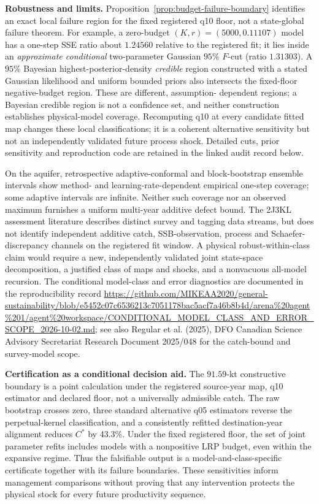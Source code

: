 \documentclass[11pt]{article}
\begin{document}
\noindent\textbf{Robustness and limits.}
Proposition~\ref{prop:budget-failure-boundary} identifies an exact local
failure region for the fixed registered q10 floor, not a state-global
failure theorem. For example, a zero-budget $(K,r)=(5000,0.11107)$ model
has a one-step SSE ratio about $1.24560$ relative to the registered fit;
it lies inside an \emph{approximate conditional} two-parameter Gaussian
$95\%$ $F$-cut (ratio $1.31303$). A $95\%$ Bayesian
highest-posterior-density \emph{credible} region constructed with a
stated Gaussian likelihood and uniform bounded priors also intersects
the fixed-floor negative-budget region. These are different, assumption-
dependent regions; a Bayesian credible region is not a confidence set,
and neither construction establishes physical-model coverage. Recomputing
q10 at every candidate fitted map changes these local classifications;
it is a coherent alternative sensitivity but not an independently
validated future process shock. Detailed cuts, prior sensitivity and
reproduction code are retained in the linked audit record below.

On the aquifer, retrospective adaptive-conformal and block-bootstrap
ensemble intervals show method- and learning-rate-dependent empirical
one-step coverage; some adaptive intervals are infinite. Neither such
coverage nor an observed maximum furnishes a uniform multi-year
additive defect bound. The 2J3KL assessment literature describes distinct
survey and tagging data streams, but does not identify independent
additive catch, SSB-observation, process and Schaefer-discrepancy channels
on the registered fit window. A physical robust-within-class claim would
require a new, independently validated joint state-space decomposition,
a justified class of maps and shocks, and a nonvacuous all-model recursion.
The conditional model-class and error diagnostics are documented in the
reproducibility record
\url{https://github.com/MIKEAA2020/general-sustainability/blob/e5452c07c6536213c7051178bac5acf7a46b8b4d/arena%20agent%201/agent%20workspace/CONDITIONAL_MODEL_CLASS_AND_ERROR_SCOPE_2026-10-02.md};
see also Regular et al. (2025), DFO Canadian Science Advisory Secretariat
Research Document 2025/048 for the catch-bound and survey-model scope.

\noindent\textbf{Certification as a conditional decision aid.}
The $91.59$-kt constructive boundary is a point calculation under the
registered source-year map, q10 estimator and declared floor, not a
universally admissible catch. The raw bootstrap crosses zero, three
standard alternative q05 estimators reverse the perpetual-kernel
classification, and a consistently refitted destination-year alignment
reduces $C^*$ by 43.3\%. Under the fixed registered floor, the set of
joint parameter refits includes models with a nonpositive LRP budget,
even within the expansive regime. Thus the falsifiable output is a
model-and-class-specific certificate together with its failure
boundaries. These sensitivities inform management comparisons without
proving that any intervention protects the physical stock for every
future productivity sequence.
\end{document}
